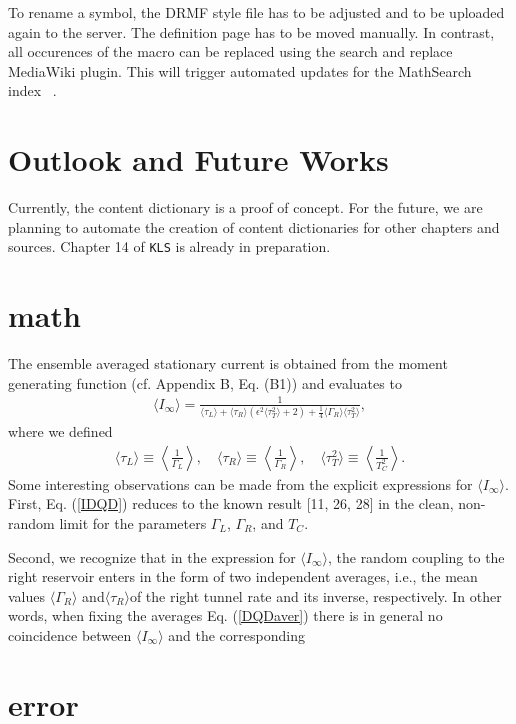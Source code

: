 \documentclass[]{article}
\begin{document}
To rename a symbol, the DRMF style file has to be adjusted and to be uploaded again to the server.
The definition page has to be moved manually. In contrast, all occurences of the macro can be replaced using the search
and replace MediaWiki plugin. This will trigger automated updates for the MathSearch index~ .
\section{Outlook and Future Works}
Currently, the content dictionary is a proof of concept.
For the future, we are planning to automate the creation of content dictionaries for other chapters and sources.
Chapter 14 of {\tt KLS} is already in preparation.
\section{math}
    \indent The ensemble averaged stationary current is obtained from the moment generating
function (cf. Appendix B, Eq. (B1)) and evaluates to
\begin{align}\label{IDQD}\tag{38}{
\langle I_\infty \rangle=\frac{1}{\langle \tau_L \rangle+ \langle \tau_R \rangle
\left(\epsilon ^2 \langle \tau_T^2 \rangle+2\right)
    +\tfrac{1}{4}\langle \Gamma_R \rangle \langle \tau_T^2 \rangle},}
\end{align}
where we defined
\begin{align}\label{DQDaver}\tag{39}{
\langle \tau_L \rangle \equiv \left\langle \frac{1}{\Gamma_L}\right\rangle,\quad
\langle \tau_R \rangle \equiv \left\langle \frac{1}{\Gamma_R}\right\rangle,\quad
\langle \tau_T^2 \rangle \equiv \left\langle \frac{1}{T_C^2}\right\rangle.}
\end{align}
Some interesting observations can be made from the explicit expressions for ${\langle
  I_\infty \rangle}$. First, Eq. (\ref{IDQD}) reduces to the known result [11, 26, 28] in the clean,
non-random limit for the parameters ${\Gamma_L}$, ${\Gamma_R}$, and
${T_C}$.


Second, we recognize that in the expression for ${\langle I_\infty \rangle}$, the random
coupling to the right reservoir enters in the form of two independent averages, i.e., the mean
values ${\langle\Gamma_R\rangle}$ and${\langle\tau_R\rangle}$of the right tunnel
rate and its inverse, respectively. In other words, when fixing the averages Eq. (\ref{DQDaver})
there is in general no coincidence between ${\langle I_\infty \rangle}$ and the
corresponding

\section{error}
\end{document}
